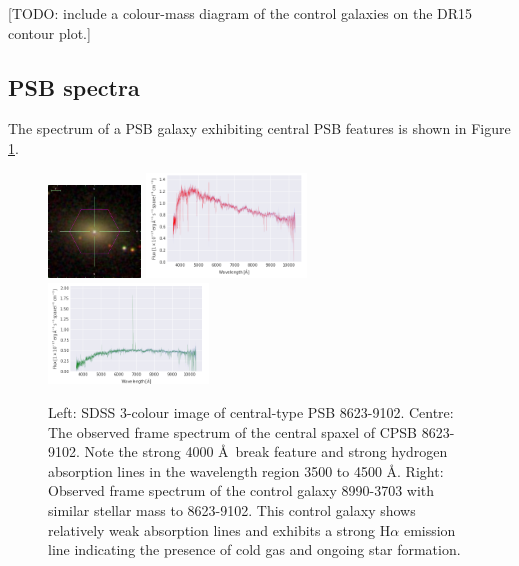[TODO: include a colour-mass diagram of the control galaxies on the DR15 contour plot.]

\subsection{PSB spectra}
The spectrum of a PSB galaxy exhibiting central PSB features is shown in Figure \ref{fig:CPSB-8623-9102-spec}.
\begin{figure}
    \centering
    \includegraphics[width=0.22\textwidth]{images/Cutouts/CPSB-8623-9102-IM.png}
    \hfill
    \includegraphics[width=0.38\textwidth]{images/Spectra/CPSB-8623-9102.png}
    \hfill
    \includegraphics[width=0.38\textwidth]{images/Spectra/CPSB-CTRL-8990-3703-spec.png}
    \caption{Left: SDSS 3-colour image of central-type PSB 8623-9102. 
    Centre: The observed frame spectrum of the central spaxel of CPSB  8623-9102. Note the strong 4000 \AA\ break feature and strong hydrogen absorption lines in the wavelength region 3500 to 4500 \AA.
    Right: Observed frame spectrum of the control galaxy 8990-3703 with similar stellar mass to 8623-9102. This control galaxy shows relatively weak absorption lines and exhibits a strong H$\alpha$ emission line indicating the presence of cold gas and ongoing star formation.}
    \label{fig:CPSB-8623-9102-spec}
\end{figure}


